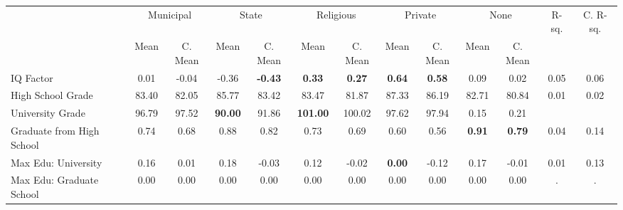 \begin{tabular}{l c c c c c c c c c c c c}
\toprule
& \multicolumn{2}{c}{Municipal} & \multicolumn{2}{c}{State} & \multicolumn{2}{c}{Religious} & \multicolumn{2}{c}{Private} & \multicolumn{2}{c}{None} & R-sq. & C. R-sq. \\
& \scriptsize Mean & \scriptsize C. Mean & \scriptsize Mean & \scriptsize C. Mean & \scriptsize Mean & \scriptsize C. Mean & \scriptsize Mean & \scriptsize C. Mean & \scriptsize Mean & \scriptsize C. Mean & & \\
\midrule
IQ Factor &      0.01 & -0.04 &     -0.36 & \textbf{    -0.43} & \textbf{     0.33} & \textbf{     0.27} & \textbf{     0.64} & \textbf{     0.58} &      0.09 & 0.02 &      0.05 &      0.06 \\
High School Grade &     83.40 & 82.05 &     85.77 & 83.42 &     83.47 & 81.87 &     87.33 & 86.19 &     82.71 & 80.84 &      0.01 &      0.02 \\
University Grade &     96.79 & 97.52 & \textbf{    90.00} & 91.86 & \textbf{   101.00} & 100.02 &     97.62 & 97.94 &      0.15 &      0.21 \\
Graduate from High School &      0.74 & 0.68 &      0.88 & 0.82 &      0.73 & 0.69 &      0.60 & 0.56 & \textbf{     0.91} & \textbf{     0.79} &      0.04 &      0.14 \\
Max Edu: University &      0.16 & 0.01 &      0.18 & -0.03 &      0.12 & -0.02 & \textbf{     0.00} & -0.12 &      0.17 & -0.01 &      0.01 &      0.13 \\
Max Edu: Graduate School &      0.00 & 0.00 &      0.00 & 0.00 &      0.00 & 0.00 &      0.00 & 0.00 &      0.00 & 0.00 &         . &         . \\
\bottomrule
\end{tabular}
